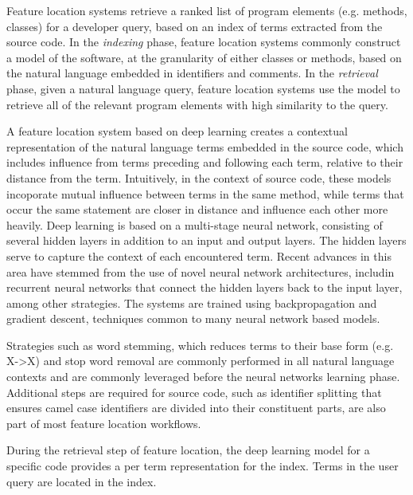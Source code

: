 
%      
%

Feature location systems retrieve a ranked list of program elements
(e.g. methods, classes) for a developer query, based on an index of
terms extracted from the source code. In the {\em indexing} phase,
feature location systems commonly construct a model of the software,
at the granularity of either classes or methods, based on the natural
language embedded in identifiers and comments. In the {\em retrieval}
phase, given a natural language query, feature location systems use
the model to retrieve all of the relevant program elements with high
similarity to the query.

A feature location system based on deep learning creates a contextual
representation of the natural language terms embedded in the source
code, which includes influence from terms preceding and following each
term, relative to their distance from the term. Intuitively, in the
context of source code, these models incoporate mutual influence
between terms in the same method, while terms that occur the same
statement are closer in distance and influence each other more
heavily. Deep learning is based on a multi-stage neural network,
consisting of several hidden layers in addition to an input and output
layers.  The hidden layers serve to capture the context of each
encountered term. Recent advances in this area have stemmed from the
use of novel neural network architectures, includin recurrent neural
networks that connect the hidden layers back to the input layer, among
other strategies. The systems are trained using backpropagation and
gradient descent, techniques common to many neural network based
models. 

Strategies such as word stemming, which reduces terms to their base
form (e.g. X->X) and stop word removal are commonly performed in all
natural language contexts and are commonly leveraged before the neural
networks learning phase. Additional steps are required for source
code, such as identifier splitting that ensures camel case identifiers
are divided into their constituent parts, are also part of most
feature location workflows.




During the retrieval step of feature location, the deep learning model for a
specific code provides a per term representation for the index. Terms in
the user query are located in the index. 


